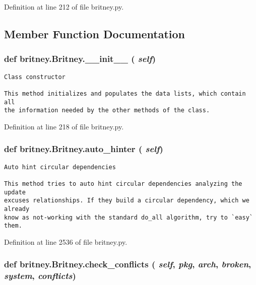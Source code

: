 Definition at line 212 of file britney.py.

\subsection{Member Function Documentation}
\subsubsection{\setlength{\rightskip}{0pt plus 5cm}def britney.Britney.\_\-\_\-init\_\-\_\- ( {\em self})}\label{classbritney_1_1Britney_5846d81eace24f479292c47e30fd1851}




\footnotesize\begin{verbatim}Class constructor

This method initializes and populates the data lists, which contain all
the information needed by the other methods of the class.
\end{verbatim}
\normalsize
 

Definition at line 218 of file britney.py.
\subsubsection{\setlength{\rightskip}{0pt plus 5cm}def britney.Britney.auto\_\-hinter ( {\em self})}\label{classbritney_1_1Britney_c9c109f54ddce53b17513405e07dba1a}




\footnotesize\begin{verbatim}Auto hint circular dependencies

This method tries to auto hint circular dependencies analyzing the update
excuses relationships. If they build a circular dependency, which we already
know as not-working with the standard do_all algorithm, try to `easy` them.
\end{verbatim}
\normalsize
 

Definition at line 2536 of file britney.py.
\subsubsection{\setlength{\rightskip}{0pt plus 5cm}def britney.Britney.check\_\-conflicts ( {\em self},  {\em pkg},  {\em arch},  {\em broken},  {\em system},  {\em conflicts})}\label{classbritney_1_1Britney_998b3ddbaedbb6cdb732b2307477e96f}




